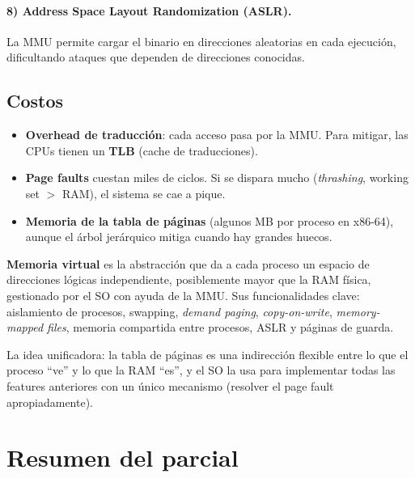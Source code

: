 \documentclass[11pt,a4paper]{article}
\begin{document}
\paragraph{8) Address Space Layout Randomization (ASLR).}
La MMU permite cargar el binario en direcciones aleatorias en cada
ejecución, dificultando ataques que dependen de direcciones
conocidas.

\subsection*{Costos}

\begin{itemize}[leftmargin=*,nosep]
    \item \textbf{Overhead de traducción}: cada acceso pasa por la
        MMU. Para mitigar, las CPUs tienen un \textbf{TLB} (cache
        de traducciones).
    \item \textbf{Page faults} cuestan miles de ciclos. Si se
        dispara mucho (\emph{thrashing}, working set $>$ RAM), el
        sistema se cae a pique.
    \item \textbf{Memoria de la tabla de páginas} (algunos MB por
        proceso en x86-64), aunque el árbol jerárquico mitiga
        cuando hay grandes huecos.
\end{itemize}

\begin{respuesta}
\textbf{Memoria virtual} es la abstracción que da a cada proceso un
espacio de direcciones lógicas independiente, posiblemente mayor
que la RAM física, gestionado por el SO con ayuda de la MMU. Sus
funcionalidades clave: aislamiento de procesos, swapping,
\emph{demand paging}, \emph{copy-on-write}, \emph{memory-mapped
files}, memoria compartida entre procesos, ASLR y páginas de guarda.

La idea unificadora: la tabla de páginas es una indirección
flexible entre lo que el proceso ``ve'' y lo que la RAM ``es'', y
el SO la usa para implementar todas las features anteriores con un
único mecanismo (resolver el page fault apropiadamente).
\end{respuesta}

\section*{Resumen del parcial}
\end{document}
